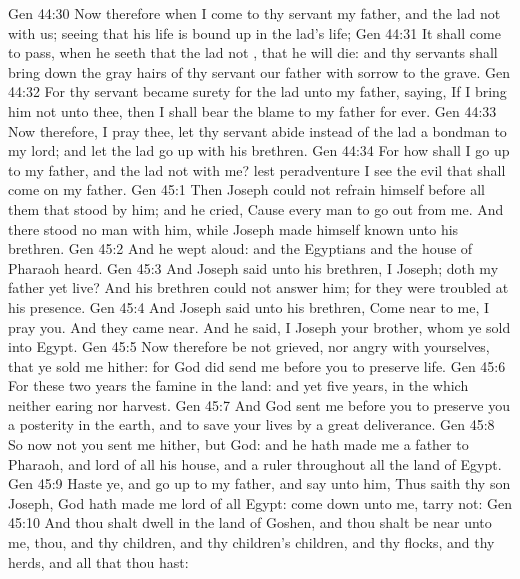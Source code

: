 \vs Gen 44:30 Now therefore when I come to thy servant my father, and the lad  not with us; seeing that his life is bound up in the lad's life;
\vs Gen 44:31 It shall come to pass, when he seeth that the lad  not , that he will die: and thy servants shall bring down the gray hairs of thy servant our father with sorrow to the grave.
\vs Gen 44:32 For thy servant became surety for the lad unto my father, saying, If I bring him not unto thee, then I shall bear the blame to my father for ever.
\vs Gen 44:33 Now therefore, I pray thee, let thy servant abide instead of the lad a bondman to my lord; and let the lad go up with his brethren.
\vs Gen 44:34 For how shall I go up to my father, and the lad  not with me? lest peradventure I see the evil that shall come on my father.
\vs Gen 45:1 Then Joseph could not refrain himself before all them that stood by him; and he cried, Cause every man to go out from me. And there stood no man with him, while Joseph made himself known unto his brethren.
\vs Gen 45:2 And he wept aloud: and the Egyptians and the house of Pharaoh heard.
\vs Gen 45:3 And Joseph said unto his brethren, I  Joseph; doth my father yet live? And his brethren could not answer him; for they were troubled at his presence.
\vs Gen 45:4 And Joseph said unto his brethren, Come near to me, I pray you. And they came near. And he said, I  Joseph your brother, whom ye sold into Egypt.
\vs Gen 45:5 Now therefore be not grieved, nor angry with yourselves, that ye sold me hither: for God did send me before you to preserve life.
\vs Gen 45:6 For these two years  the famine  in the land: and yet  five years, in the which  neither  earing nor harvest.
\vs Gen 45:7 And God sent me before you to preserve you a posterity in the earth, and to save your lives by a great deliverance.
\vs Gen 45:8 So now  not you  sent me hither, but God: and he hath made me a father to Pharaoh, and lord of all his house, and a ruler throughout all the land of Egypt.
\vs Gen 45:9 Haste ye, and go up to my father, and say unto him, Thus saith thy son Joseph, God hath made me lord of all Egypt: come down unto me, tarry not:
\vs Gen 45:10 And thou shalt dwell in the land of Goshen, and thou shalt be near unto me, thou, and thy children, and thy children's children, and thy flocks, and thy herds, and all that thou hast:
